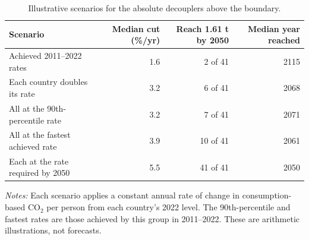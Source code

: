 \begin{table}[tbp]
\centering
\small
\caption{Illustrative scenarios for the absolute decouplers above the boundary.}
\label{tab:scenarios}
\begin{threeparttable}
\begin{tabular}{lrrr}
\toprule
Scenario & Median cut (\%/yr) & Reach 1.61 t by 2050 & Median year reached \\
\midrule
Achieved 2011--2022 rates & 1.6 & 2 of 41 & 2115 \\
Each country doubles its rate & 3.2 & 6 of 41 & 2068 \\
All at the 90th-percentile rate & 3.2 & 7 of 41 & 2071 \\
All at the fastest achieved rate & 3.9 & 10 of 41 & 2061 \\
Each at the rate required by 2050 & 5.5 & 41 of 41 & 2050 \\
\bottomrule
\end{tabular}
\begin{tablenotes}[flushleft]
\footnotesize
\item \textit{Notes:} Each scenario applies a constant annual rate of change in consumption-based CO$_2$ per person from each country's 2022 level. The 90th-percentile and fastest rates are those achieved by this group in 2011--2022. These are arithmetic illustrations, not forecasts.
\end{tablenotes}
\end{threeparttable}
\end{table}
